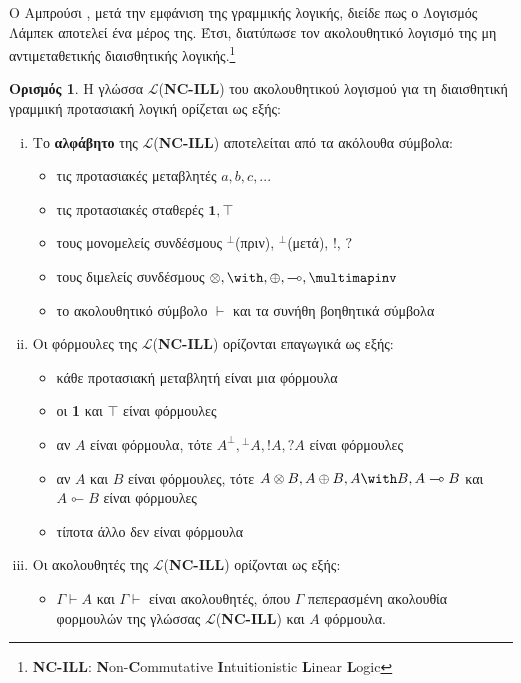 \documentclass [a4paper,11pt] {book}
\theoremstyle{definition}
\theoremstyle{definition}
\newtheorem{definition}[theorem]{Ορισμός}
\begin{document}
Ο Αμπρούσι \citep{Abrusci90}, μετά την εμφάνιση της γραμμικής λογικής, διείδε πως ο Λογισμός Λάμπεκ αποτελεί ένα μέρος της. Έτσι, διατύπωσε τον ακολουθητικό λογισμό της μη αντιμεταθετικής διαισθητικής λογικής.\footnote{\textbf{NC-ILL}: \textbf{N}on-\textbf{C}ommutative \textbf{I}ntuitionistic \textbf{L}inear \textbf{L}ogic}
\begin{definition}
Η γλώσσα $\mathcal{L}$(\textbf{NC-ILL}) του ακολουθητικού λογισμού για τη διαισθητική γραμμική προτασιακή λογική ορίζεται ως εξής:
\begin{enumerate}[i.]
\item Το \textbf{αλφάβητο} της $\mathcal{L}$(\textbf{NC-ILL}) αποτελείται από τα ακόλουθα σύμβολα:
\begin{itemize}
\item τις προτασιακές μεταβλητές $a,b,c,...$
\item τις προτασιακές σταθερές $\textbf{1},\top$
\item τους μονομελείς συνδέσμους $^{\bot}$(πριν), $^{\bot}$(μετά), $!$, $?$
\item τους διμελείς συνδέσμους $\otimes,\with,\oplus,\multimap,\multimapinv$
\item το ακολουθητικό σύμβολο $\vdash$ και τα συνήθη βοηθητικά σύμβολα
\end{itemize}
\item Οι φόρμουλες της $\mathcal{L}$(\textbf{NC-ILL}) ορίζονται επαγωγικά ως εξής:
\begin{itemize}
\item κάθε προτασιακή μεταβλητή είναι μια φόρμουλα
\item οι \textbf{1} και $\top$ είναι φόρμουλες
\item αν $A$ είναι φόρμουλα, τότε $A^{\bot}, {}^{\bot}A,!A,?A$ είναι φόρμουλες
\item αν $A$ και $B$ είναι φόρμουλες, τότε $A\otimes B, A\oplus B,A\with B,A\multimap B$ και $A\multimapinv B$ είναι φόρμουλες
\item τίποτα άλλο δεν είναι φόρμουλα
\end{itemize}
\item Οι ακολουθητές της $\mathcal{L}$(\textbf{NC-ILL}) ορίζονται ως εξής:
\begin{itemize}
\item $\Gamma \vdash A$ και $\Gamma \vdash$ είναι ακολουθητές, όπου $\Gamma$ πεπερασμένη ακολουθία φορμουλών της γλώσσας $\mathcal{L}$(\textbf{NC-ILL}) και $A$ φόρμουλα.
\end{itemize}
\end{enumerate}

\end{definition}
\end{document}
